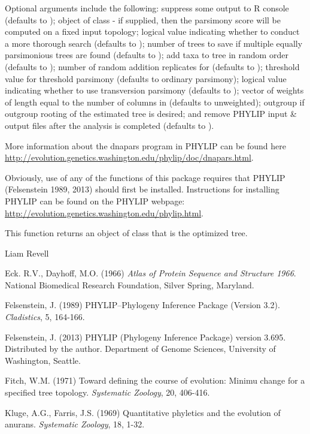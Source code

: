 \documentclass[a4paper]{book}
\begin{document}
%
\begin{Details}\relax
Optional arguments include the following:  suppress some output to R console (defaults to );  object of class  - if supplied, then the parsimony score will be computed on a fixed input topology;  logical value indicating whether to conduct a more thorough search (defaults to );  number of trees to save if multiple equally parsimonious trees are found (defaults to );  add taxa to tree in random order (defaults to );  number of random addition replicates for  (defaults to );  threshold value for threshold parsimony (defaults to ordinary parsimony);  logical value indicating whether to use transversion parsimony (defaults to );  vector of weights of length equal to the number of columns in  (defaults to unweighted);  outgroup if outgroup rooting of the estimated tree is desired; and  remove PHYLIP input \& output files after the analysis is completed (defaults to ).

More information about the dnapars program in PHYLIP can be found here \url{http://evolution.genetics.washington.edu/phylip/doc/dnapars.html}.

Obviously, use of any of the functions of this package requires that PHYLIP (Felsenstein 1989, 2013) should first be installed. Instructions for installing PHYLIP can be found on the PHYLIP webpage: \url{http://evolution.genetics.washington.edu/phylip.html}.
\end{Details}
%
\begin{Value}
This function returns an object of class  that is the optimized tree.
\end{Value}
%
\begin{Author}\relax
Liam Revell 
\end{Author}
%
\begin{References}\relax
Eck. R.V., Dayhoff, M.O. (1966) \emph{Atlas of Protein Sequence and Structure 1966}. National Biomedical Research Foundation, Silver Spring, Maryland.

Felsenstein, J. (1989) PHYLIP--Phylogeny Inference Package (Version 3.2). \emph{Cladistics}, 5, 164-166.

Felsenstein, J. (2013) PHYLIP (Phylogeny Inference Package) version 3.695. Distributed by the author. Department of Genome Sciences, University of Washington, Seattle.

Fitch, W.M. (1971) Toward defining the course of evolution: Minimu change for a specified tree topology. \emph{Systematic Zoology}, 20, 406-416.

Kluge, A.G., Farris, J.S. (1969) Quantitative phyletics and the evolution of anurans. \emph{Systematic Zoology}, 18, 1-32.
\end{References}
\end{document}

